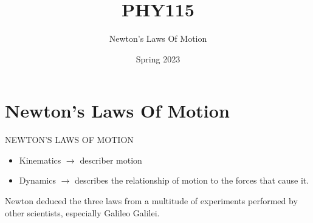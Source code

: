 \documentclass[]{beamer}
\title{PHY115}    %
\author{Newton's Laws Of Motion}                 %
\institute{Digipen}      %
\date{Spring 2023}
\begin{document}
\begin{frame}
  \titlepage
\end{frame}

\section[]{}

\begin{frame}
  \tableofcontents
\end{frame}

\section{Newton's Laws Of Motion}


               \begin{frame}
NEWTON'S LAWS OF MOTION

\vspace{5mm}


\begin{itemize}
  \item Kinematics $\rightarrow$ describer motion
\item Dynamics $\rightarrow$ describes the relationship
of motion to the forces that cause it.
\end{itemize}
    
\end{frame}




\begin{frame}




Newton  deduced the three laws from
a multitude of experiments performed by other scientists, especially Galileo
Galilei.



\end{frame}
\end{document}
